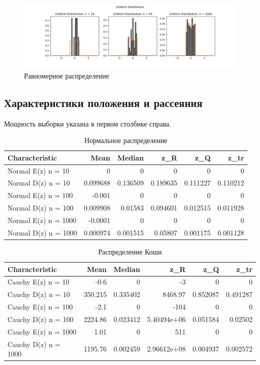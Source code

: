 \documentclass[../body.tex]{subfiles}
\begin{document}
	\begin{figure}[H]
		\centering
		\includegraphics[width=\textwidth, height =0.25\textheight]{img/Uniform.png}
		\caption{Равномерное распределение}
		\label{fig:uniform}
	\end{figure}

	\subsection{Характеристики положения и рассеяния}
	Мощность выборки указана в первом столбике справа.
	\begin{table}[H]
		\centering
		\begin{tabular}[t]{lrrrrr}
			\hline
			Characteristic   &      Mean &    Median &       z\_R &      z\_Q &      z\_tr \\
			\hline
			Normal E(z) n = 10   &  0 &  0 &  0 & 0  &  0 \\
			Normal D(z) n = 10   &  0.099688 &  0.136509 &  0.189635 & 0.111227 &  0.110212 \\
			Normal E(z) n = 100  & -0.001 &  0  &  0 & 0 &  0 \\
			Normal D(z) n = 100  &  0.009908 &  0.01583  &  0.094601 & 0.012515 &  0.011928 \\
			Normal E(z) n = 1000 & -0.0001 & 0  & 0  & 0  & 0 \\
			Normal D(z) n = 1000 &  0.000974 &  0.001515 &  0.05807  & 0.001175 &  0.001128 \\
			\hline
		\end{tabular}
		\caption{Нормальное распределение}
		\label{tab:normal}
	\end{table}

	\begin{table}[H]
	\centering
		\begin{tabular}[t]{lrrrrr}
			\hline
			Characteristic   &        Mean &    Median &            z\_R &       z\_Q &      z\_tr \\
			\hline
			Cauchy E(z) n = 10   &   -0.6 &  0 &   -3     &  0 &  0 \\
			Cauchy D(z) n = 10   &  350.215    &  0.335402 & 8468.97        &  0.852087 &  0.491287 \\
			Cauchy E(z) n = 100  &   -2.1  & 0 & -104       &  0 &  0 \\
			Cauchy D(z) n = 100  & 2224.86     &  0.023412 &    5.40494e+06 &  0.051584 &  0.02502  \\
			Cauchy E(z) n = 1000 &    1.01  &  0 &  511       &  0  &  0 \\
			Cauchy D(z) n = 1000 & 1195.76     &  0.002459 &    2.96612e+08 &  0.004937 &  0.002572 \\
			\hline
		\end{tabular}
	\caption{Распределение Коши}
	\label{tab:couchy}
	\end{table}
	
\end{document}
